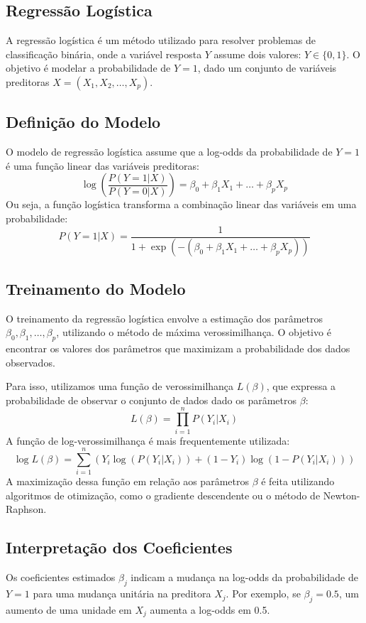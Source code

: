 \documentclass{sciposter}
\begin{document}
\begin{multicols}{3}
\section{Regressão Logística}

A regressão logística é um método utilizado para resolver problemas de classificação binária, onde a variável resposta \(Y\) assume dois valores: \(Y \in \{0, 1\}\). O objetivo é modelar a probabilidade de \(Y = 1\), dado um conjunto de variáveis preditoras \(X = (X_1, X_2, \dots, X_p)\).

\subsection{Definição do Modelo}
O modelo de regressão logística assume que a log-odds da probabilidade de \(Y = 1\) é uma função linear das variáveis preditoras:
\[
\log\left(\frac{P(Y = 1|X)}{P(Y = 0|X)}\right) = \beta_0 + \beta_1 X_1 + \dots + \beta_p X_p
\]
Ou seja, a função logística transforma a combinação linear das variáveis em uma probabilidade:
\[
P(Y = 1|X) = \frac{1}{1 + \exp(-(\beta_0 + \beta_1 X_1 + \dots + \beta_p X_p))}
\]

\subsection{Treinamento do Modelo}
O treinamento da regressão logística envolve a estimação dos parâmetros \(\beta_0, \beta_1, \dots, \beta_p\), utilizando o método de máxima verossimilhança. O objetivo é encontrar os valores dos parâmetros que maximizam a probabilidade dos dados observados.

Para isso, utilizamos uma função de verossimilhança \(L(\beta)\), que expressa a probabilidade de observar o conjunto de dados dado os parâmetros \(\beta\):
\[
L(\beta) = \prod_{i=1}^{n} P(Y_i|X_i)
\]
A função de log-verossimilhança é mais frequentemente utilizada:
\[
\log L(\beta) = \sum_{i=1}^{n} \left( Y_i \log(P(Y_i|X_i)) + (1 - Y_i) \log(1 - P(Y_i|X_i)) \right)
\]
A maximização dessa função em relação aos parâmetros \(\beta\) é feita utilizando algoritmos de otimização, como o gradiente descendente ou o método de Newton-Raphson.

\subsection{Interpretação dos Coeficientes}
Os coeficientes estimados \(\beta_j\) indicam a mudança na log-odds da probabilidade de \(Y = 1\) para uma mudança unitária na preditora \(X_j\). Por exemplo, se \(\beta_j = 0.5\), um aumento de uma unidade em \(X_j\) aumenta a log-odds em 0.5.
    

\end{multicols}
\end{document}
